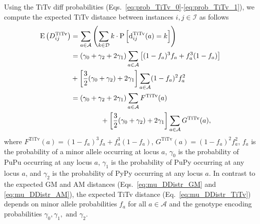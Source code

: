 \documentclass[aoas]{imsart}
\begin{document}
Using the TiTv diff probabilities (Eqs.~\ref{eq:prob_TiTv_0}-\ref{eq:prob_TiTv_1}), we compute the expected TiTv distance between instances $i,j \in \mathcal{I}$ as follows
%
\begin{equation}\label{eq:mu_DDistr_TiTv}
\begin{aligned}
\text{E}\left(D^\text{TiTv}_{ij}\right) &= \sum_{a \in \mathcal{A}} \left(\sum_{k \in \mathcal{D}} k \cdot \text{P}\left[\text{d}^\text{TiTv}_{ij}(a) = k\right]\right) \\
&= (\gamma_0 + \gamma_2 + 2\gamma_1) \sum_{a \in \mathcal{A}} \left[(1 - f_a)^3 f_a + f^3_a (1 - f_a)\right] \\
&+ \left[\frac{3}{2}(\gamma_0 + \gamma_2) + 2\gamma_1\right] \sum_{a \in \mathcal{A}} (1 - f_a)^2 f^2_a \\
&= (\gamma_0 + \gamma_2 + 2\gamma_1) \sum_{a \in \mathcal{A}} F^\text{TiTv}(a)\\
&\hspace{1.5cm} + \left[\frac{3}{2}(\gamma_0 + \gamma_2) + 2\gamma_1\right] \sum_{a \in \mathcal{A}} G^\text{TiTv}(a),
\end{aligned}
\end{equation}
%
where $F^\text{TiTv}(a) = (1 - f_a)^3 f_a + f^3_a (1 - f_a)$, $G^\text{TiTv}(a) = (1 - f_a)^2 f^2_a$, $f_a$ is the probability of a minor allele occurring at locus $a$, $\gamma_0$ is the probability of PuPu occurring at any locus $a$, $\gamma_1$ is the probability of PuPy occurring at any locus $a$, and $\gamma_2$ is the probability of PyPy occurring at any locus $a$. In contrast to the expected GM and AM distances (Eqs.~\ref{eq:mu_DDistr_GM} and \ref{eq:mu_DDistr_AM}), the expected TiTv distance (Eq.~\ref{eq:mu_DDistr_TiTv}) depends on minor allele probabilities $f_a$ for all $a \in \mathcal{A}$ and the genotype encoding probabilities $\gamma_0, \gamma_1, \text{ and } \gamma_2$. 
\end{document}
